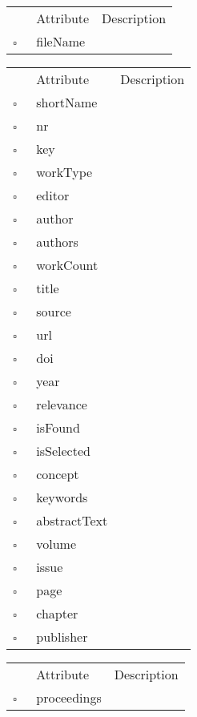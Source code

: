 \clearpage
\begin{table}
\caption{Orphan  }

\begin{longtable}{llp{8cm}}
& Attribute & Description \\
$\square$\ & fileName &  \\
\end{longtable}
\label{attr:Orphan}
\end{table}

\begin{table}
\caption{OtherWork  }

\begin{longtable}{llp{8cm}}
& Attribute & Description \\
$\square$\ & shortName &  \\
$\square$\ & nr &  \\
$\square$\ & key &  \\
$\square$\ & workType &  \\
$\square$\ & editor &  \\
$\square$\ & author &  \\
$\square$\ & authors &  \\
$\square$\ & workCount &  \\
$\square$\ & title &  \\
$\square$\ & source &  \\
$\square$\ & url &  \\
$\square$\ & doi &  \\
$\square$\ & year &  \\
$\square$\ & relevance &  \\
$\square$\ & isFound &  \\
$\square$\ & isSelected &  \\
$\square$\ & concept &  \\
$\square$\ & keywords &  \\
$\square$\ & abstractText &  \\
$\square$\ & volume &  \\
$\square$\ & issue &  \\
$\square$\ & page &  \\
$\square$\ & chapter &  \\
$\square$\ & publisher &  \\
\end{longtable}
\label{attr:OtherWork}
\end{table}

\begin{table}
\caption{Paper  }

\begin{longtable}{llp{8cm}}
& Attribute & Description \\
$\square$\ & proceedings &  \\
\end{longtable}
\label{attr:Paper}
\end{table}

